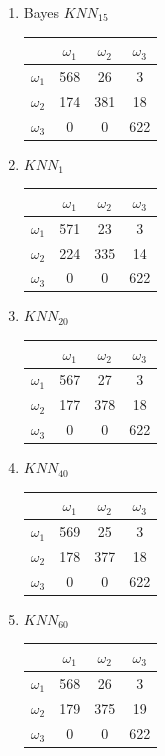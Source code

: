 \documentclass[a4paper]{article}
\begin{document}
\begin{multicols}{2}
\begin{enumerate}
\columnbreak

\item Bayes $KNN_{15}$

\begin{tabular}{ | l | c | c | c | }
\hline
& $\omega_1$ & $\omega_2$ & $\omega_3$ \\
\hline
  $\omega_1$ & 568 & 26 & 3 \\
\hline
  $\omega_2$ & 174 & 381 & 18 \\
\hline
  $\omega_3$ & 0 & 0 & 622 \\
\hline
\end{tabular}


\item $KNN_{1}$

\begin{tabular}{ | l | c | c | c | }
\hline
& $\omega_1$ & $\omega_2$ & $\omega_3$ \\
\hline
  $\omega_1$ & 571 & 23 & 3 \\
\hline
  $\omega_2$ & 224 & 335 & 14 \\
\hline
  $\omega_3$ & 0 & 0 & 622 \\
\hline
\end{tabular}


\item $KNN_{20}$

\begin{tabular}{ | l | c | c | c | }
\hline
& $\omega_1$ & $\omega_2$ & $\omega_3$ \\
\hline
  $\omega_1$ & 567 & 27 & 3 \\
\hline
  $\omega_2$ & 177 & 378 & 18 \\
\hline
  $\omega_3$ & 0 & 0 & 622 \\
\hline
\end{tabular}


\item $KNN_{40}$

\begin{tabular}{ | l | c | c | c | }
\hline
& $\omega_1$ & $\omega_2$ & $\omega_3$ \\
\hline
  $\omega_1$ & 569 & 25 & 3 \\
\hline
  $\omega_2$ & 178 & 377 & 18 \\
\hline
  $\omega_3$ & 0 & 0 & 622 \\
\hline
\end{tabular}


\item $KNN_{60}$

\begin{tabular}{ | l | c | c | c | }
\hline
& $\omega_1$ & $\omega_2$ & $\omega_3$ \\
\hline
  $\omega_1$ & 568 & 26 & 3 \\
\hline
  $\omega_2$ & 179 & 375 & 19 \\
\hline
  $\omega_3$ & 0 & 0 & 622 \\
\hline
\end{tabular}

\end{enumerate}
\end{multicols}
\end{document}
